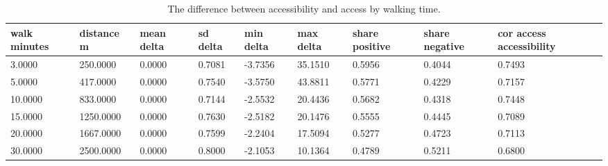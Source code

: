 \begin{table}[t]\centering
\caption{The difference between accessibility and access by walking time.}\label{tab:delta}
\begin{tabular}{lllllllll}
\hline
walk minutes & distance m & mean delta & sd delta & min delta & max delta & share positive & share negative & cor access accessibility \\
\hline
3.0000 & 250.0000 & 0.0000 & 0.7081 & -3.7356 & 35.1510 & 0.5956 & 0.4044 & 0.7493 \\
5.0000 & 417.0000 & 0.0000 & 0.7540 & -3.5750 & 43.8811 & 0.5771 & 0.4229 & 0.7157 \\
10.0000 & 833.0000 & 0.0000 & 0.7144 & -2.5532 & 20.4436 & 0.5682 & 0.4318 & 0.7448 \\
15.0000 & 1250.0000 & 0.0000 & 0.7630 & -2.5182 & 20.1476 & 0.5555 & 0.4445 & 0.7089 \\
20.0000 & 1667.0000 & 0.0000 & 0.7599 & -2.2404 & 17.5094 & 0.5277 & 0.4723 & 0.7113 \\
30.0000 & 2500.0000 & 0.0000 & 0.8000 & -2.1053 & 10.1364 & 0.4789 & 0.5211 & 0.6800 \\
\hline
\end{tabular}\end{table}
